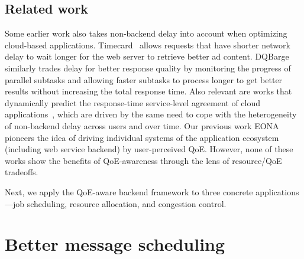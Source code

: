 \subsection{Related work}
Some earlier work also takes non-backend delay into account when optimizing cloud-based applications. 
Timecard~\cite{timecard} allows requests that have shorter network delay to wait longer for the web server to retrieve better ad content. 
DQBarge~\cite{dqbarge} similarly trades delay for better response quality by monitoring the progress of parallel subtasks and allowing faster subtasks to process longer to get better results without increasing the total response time.
Also relevant are works that dynamically predict the response-time service-level agreement of cloud applications~\cite{Rich Wolski}, which are driven by the same need to cope with the heterogeneity of non-backend delay across users and over time.
Our previous work EONA~\cite{eona} pioneers the idea of driving individual systems of the application ecosystem (including web service backend) by user-perceived QoE.
However, none of these works show the benefits of QoE-awareness through the lens of resource/QoE tradeoffs. 

Next, we apply the QoE-aware backend framework to three concrete applications---job scheduling, resource allocation, and congestion control. 








\section{Better message scheduling}
\label{sec:scheduling}

